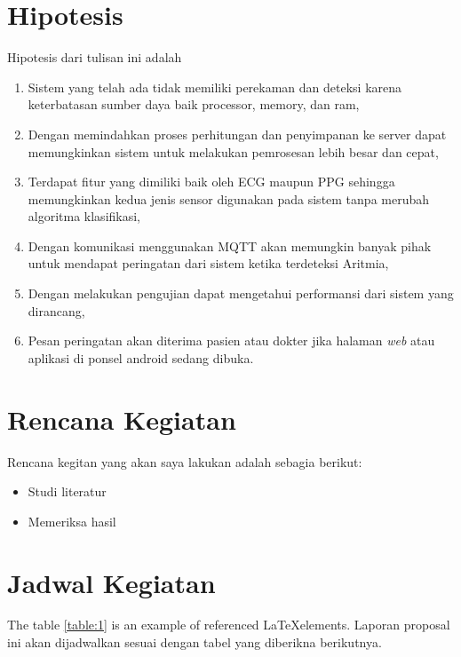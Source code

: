 \section{Hipotesis}
Hipotesis dari tulisan ini adalah
\begin{enumerate}
    \item Sistem yang telah ada tidak memiliki perekaman dan deteksi karena keterbatasan sumber daya baik processor, memory, dan ram,
    \item Dengan memindahkan proses perhitungan dan penyimpanan ke server dapat memungkinkan sistem untuk melakukan pemrosesan lebih besar dan cepat,
    \item Terdapat fitur yang dimiliki baik oleh ECG maupun PPG sehingga memungkinkan kedua jenis sensor digunakan pada sistem tanpa merubah algoritma klasifikasi,
    \item Dengan komunikasi menggunakan MQTT akan memungkin banyak pihak untuk mendapat peringatan dari sistem ketika terdeteksi Aritmia,
	\item Dengan melakukan pengujian dapat mengetahui performansi dari sistem yang dirancang,
	\item Pesan peringatan akan diterima pasien atau dokter jika halaman \textit{web} atau aplikasi di ponsel android sedang dibuka.
\end{enumerate}
\iflogTA
\else
\section{Rencana Kegiatan}
Rencana kegitan yang akan saya lakukan adalah sebagia berikut:
\begin{itemize}
    \item Studi literatur
    \item Memeriksa hasil
\end{itemize}
\section{Jadwal Kegiatan}
The table \ref{table:1} is an example of referenced \LaTeX elements. Laporan proposal ini akan dijadwalkan sesuai dengan tabel yang diberikna berikutnya. 

